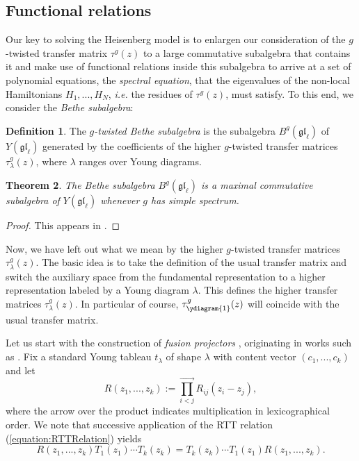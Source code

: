 \documentclass[11pt]{report}
\newtheorem{theorem}{Theorem}[section]
\theoremstyle{definition}
\newtheorem{definition}[theorem]{Definition}
\theoremstyle{remark}
\theoremstyle{remark}
\begin{document}
\subsection{Functional relations}

Our key to solving the Heisenberg model is to enlargen our consideration of the $g$-twisted transfer matrix $\tau^g(z)$ to a large commutative subalgebra that contains it and make use of functional relations inside this subalgebra to arrive at a set of polynomial equations, the \emph{spectral equation}, that the eigenvalues of the non-local Hamiltonians $H_1,...,H_N$, \emph{i.e.} the residues of $\tau^g(z)$, must satisfy. To this end, we consider the \emph{Bethe subalgebra}:

\begin{definition}
The \emph{$g$-twisted Bethe subalgebra} is the subalgebra $B^g(\mathfrak{gl}_\ell)$ of $Y(\mathfrak{gl}_\ell)$ generated by the coefficients of the higher $g$-twisted transfer matrices $\tau_\lambda^g(z)$, where $\lambda$ ranges over Young diagrams.
\end{definition}

\begin{theorem}
The Bethe subalgebra $B^g(\mathfrak{gl}_\ell)$ is a maximal commutative subalgebra of $Y(\mathfrak{gl}_\ell)$ whenever $g$ has simple spectrum.
\end{theorem}

\begin{proof}
This appears in \cite{article:nazarov:1996}.
\end{proof}

Now, we have left out what we mean by the higher $g$-twisted transfer matrices $\tau_\lambda^g(z)$. The basic idea is to take the definition of the usual transfer matrix and switch the auxiliary space from the fundamental representation to a higher representation labeled by a Young diagram $\lambda$. This defines the higher transfer matrices $\tau_\lambda^g(z)$. In particular of course, $\tau_{\ydiagram{1}}^g(z)$ will coincide with the usual transfer matrix.

Let us start with the construction of \emph{fusion projectors} \cite{article:molev:2008}, originating in works such as \cite{article:kulish:1981}. Fix a standard Young tableau $t_\lambda$ of shape $\lambda$ with content vector $(c_1,...,c_k)$ and let
\begin{equation*}
R(z_1,...,z_k) := \overset{\longrightarrow}{\prod_{i<j}} R_{ij}(z_i-z_j),
\end{equation*}
where the arrow over the product indicates multiplication in lexicographical order. We note that successive application of the RTT relation (\ref{equation:RTTRelation}) yields
\begin{equation}\label{equation:higherRTT}
R(z_1,...,z_k) T_1(z_1) \cdots T_k(z_k) = T_k(z_k) \cdots T_1(z_1) R(z_1,...,z_k).
\end{equation}
\end{document}
